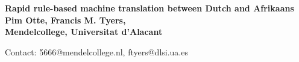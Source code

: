 \documentclass[a0,landscape]{a0poster}
\begin{document}

\begin{minipage}[b]{0.75\linewidth} 
\veryHuge \bf 
\textsf{Rapid rule-based machine translation between Dutch and Afrikaans}
\\[1cm]
\huge \bf Pim Otte, Francis M. Tyers,\\
\huge \rm Mendelcollege, Universitat d'Alacant
\end{minipage}
\begin{minipage}[b]{0.25\linewidth} 
\Large 
Contact: 5666@mendelcollege.nl, ftyers@dlsi.ua.es \\

\end{minipage}
%
\end{document}
